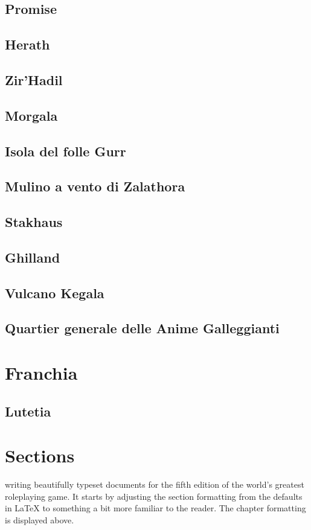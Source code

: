 \documentclass[letterpaper,twocolumn,openany,nodeprecatedcode]{dndbook}
\begin{document}
\section{Promise}
\section{Herath}
\section{Zir'Hadil}
\section{Morgala}
\section{Isola del folle Gurr}
\section{Mulino a vento di Zalathora}
\section{Stakhaus}
\section{Ghilland}
\section{Vulcano Kegala}
\section{Quartier generale delle Anime Galleggianti}

\chapter{Franchia}
\section{Lutetia}

\chapter{Sections}

 writing beautifully typeset documents for the fifth edition of the world's greatest roleplaying game. It starts by adjusting the section formatting from the defaults in \LaTeX{} to something a bit more familiar to the reader. The chapter formatting is displayed above.
\end{document}
